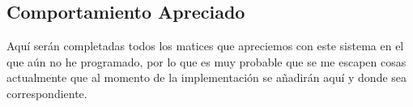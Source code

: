 \documentclass[a4paper,openright,12pt]{article}
\begin{document}
\subsection{Comportamiento Apreciado}
Aquí serán completadas todos los matices que apreciemos con este sistema en el que aún no he programado, por lo que es muy probable que se me
escapen cosas actualmente que al momento de la implementación se añadirán aquí y donde sea correspondiente.


\clearpage
\begin{flushleft}
\printbibliography[]{}
\end{flushleft}
\end{document}
